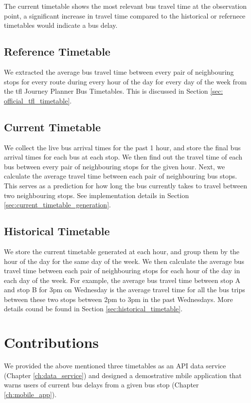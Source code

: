 \par The current timetable shows the most relevant bus travel time at the observation point, a significant increase in travel time compared to the historical or refernece timetables would indicate a bus delay.

\subsection{Reference Timetable}
\par We extracted the average bus travel time between every pair of neighbouring stops for every route during every hour of the day for every day of the week from the \acrshort{tfl} Journey Planner Bus Timetables. This is discussed in Section \ref{sec: official_tfl_timetable}.

\subsection{Current Timetable}
\par We collect the live bus arrival times for the past 1 hour, and store the final bus arrival times for each bus at each stop. We then find out the travel time of each bus between every pair of neighbouring stops for the given hour. Next, we calculate the average travel time between each pair of neighbouring bus stops. This serves as a prediction for how long the bus currently takes to travel between two neighbouring stops. See implementation details in Section \ref{sec:current_timetable_generation}.

\subsection{Historical Timetable}
\par We store the current timetable generated at each hour, and group them by the hour of the day for the same day of the week. We then calculate the average bus travel time between each pair of neighbouring stops for each hour of the day in each day of the week. For example, the average bus travel time between stop A and stop B for 3pm on Wednesday is the average travel time for all the bus trips between these two stops between 2pm to 3pm in the past Wednesdays. More details cound be found in Section \ref{sec:historical_timetable}.

\section{Contributions}
\par We provided the above mentioned three timetables as an API data service (Chapter \ref{ch:data_service}) and designed a demostrative mbile application that warns users of current bus delays from a given bus stop (Chapter \ref{ch:mobile_app}).


